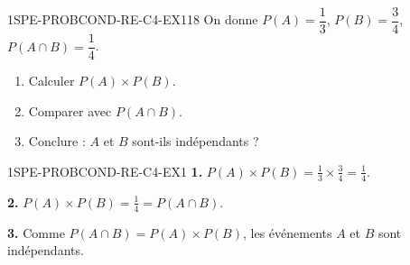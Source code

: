 

\begin{exercice}{1SPE-PROBCOND-RE-C4-EX1}{1}{8}
On donne $P(A) = \dfrac{1}{3}$, $P(B) = \dfrac{3}{4}$, $P(A \cap B) = \dfrac{1}{4}$.

\begin{enumerate}
  \item Calculer $P(A) \times P(B)$.
  \item Comparer avec $P(A \cap B)$.
  \item Conclure : $A$ et $B$ sont-ils indépendants ?
\end{enumerate}
\end{exercice}


\begin{corrige}{1SPE-PROBCOND-RE-C4-EX1}
\textbf{1.} $P(A) \times P(B) = \frac{1}{3} \times \frac{3}{4} = \frac{1}{4}$.

\textbf{2.} $P(A) \times P(B) = \frac{1}{4} = P(A \cap B)$.

\textbf{3.} Comme $P(A \cap B) = P(A) \times P(B)$, les événements $A$ et $B$ sont indépendants.
\end{corrige}
